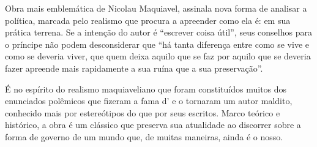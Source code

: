\hspace*{-7cm}\hrulefill\hspace*{-7cm}

\medskip

\noindent{} Obra mais emblemática de Nicolau Maquiavel, {} assinala nova forma de analisar a política, marcada pelo realismo que procura a apreender como ela é: em sua prática terrena. Se a intenção do autor é “escrever coisa útil”, seus conselhos para o príncipe não podem desconsiderar que “há tanta diferença entre como se vive e como se deveria viver, que quem deixa aquilo que se faz por aquilo que se deveria fazer apreende mais rapidamente a sua ruína que a sua preservação”.

É no espírito do realismo maquiaveliano que foram constituídos muitos dos enunciados polêmicos que fizeram a fama d'{} e o tornaram um autor maldito, conhecido mais por estereótipos do que por seus escritos. Marco teórico e histórico, a obra é um clássico que preserva sua atualidade ao discorrer sobre a forma de governo de um mundo que, de muitas maneiras, ainda é o nosso.


\vfill

\hspace*{-.4cm}\begin{minipage}[c]{.5\linewidth}
\small{
{}}
\end{minipage}



\pagebreak
\pagestyle{hedracat}

